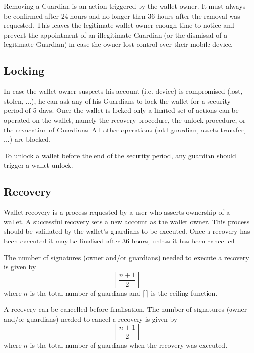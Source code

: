 \documentclass[12pt]{article}
\begin{document}
Removing a Guardian is an action triggered by the wallet owner. It must always be confirmed after 24 hours and no longer then 36 hours after the removal was requested. This leaves the legitimate wallet owner enough time to notice and prevent the appointment of an illegitimate Guardian (or the dismissal of a legitimate Guardian) in case the owner lost control over their mobile device.

\subsection{Locking}

In case the wallet owner suspects his account (i.e. device) is compromised (lost, stolen, ...), he can ask any of his Guardians to lock the wallet for a security period of 5 days. Once the wallet is locked only a limited set of actions can be operated on the wallet, namely the recovery procedure, the unlock procedure, or the revocation of Guardians. All other operations (add guardian, assets transfer, ...) are blocked. 

To unlock a wallet before the end of the security period, any guardian should trigger a wallet unlock.

\subsection{Recovery}

Wallet recovery is a process requested by a user who asserts ownership of a wallet. A successful recovery sets a new account as the wallet owner. This process should be validated by the wallet's guardians to be executed. Once a recovery has been executed it may be finalised after 36 hours, unless it has been cancelled.

The number of signatures (owner and/or guardians) needed to execute a recovery is given by
\begin{equation*}
    \left\lceil {\frac{n+1}{2}} \right\rceil
\end{equation*}
where $n$ is the total number of guardians and $\lceil\rceil$ is the ceiling function.

A recovery can be cancelled before finalisation. The number of signatures (owner and/or guardians) needed to cancel a recovery is given by
\begin{equation*}
    \left\lceil {\frac{n+1}{2}} \right\rceil
\end{equation*}
where $n$ is the total number of guardians when the recovery was executed.
\end{document}
